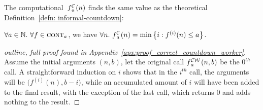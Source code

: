 \noindent The computational~$\cdt{f}{a}(n)$
finds the same value as the theoretical 
Definition~\ref{defn: informal-countdown}:
\begin{thm} \label{thm: cdt-repeat}
	$\forall a \in \mathbb{N}.~ \forall f\in \text{\scshape{cont}}_{a}$, we have 
$	\forall n.~ \cdt{f}{a}(n) = \min\left\{ i : f^{(i)}(n) \le a \right\} $.
\end{thm}
\begin{proof}[outline, full proof found in Appendix~\ref{apx:proof_correct_countdown_worker}]
	Assume the initial arguments $(n, b)$, let the original call $\cdw{f}{a}(n, b)$ be the $0^{th}$ call. A straightforward induction on $i$ shows that in the $i^{th}$ call, the arguments will be $\big(f^{(i)}(n), b-i\big)$, while an accumulated amount of $i$ will have been added to the final result, with the exception of the last call, which returns $0$ and adds nothing to the result.
	

\end{proof}
